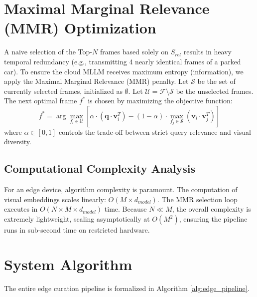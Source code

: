 \documentclass[11pt, a4paper, oneside]{report}
\begin{document}
\section{Maximal Marginal Relevance (MMR) Optimization}
A naive selection of the Top-$N$ frames based solely on $S_{rel}$ results in heavy temporal redundancy (e.g., transmitting 4 nearly identical frames of a parked car). To ensure the cloud MLLM receives maximum entropy (information), we apply the Maximal Marginal Relevance (MMR) penalty.
Let $\mathcal{S}$ be the set of currently selected frames, initialized as $\emptyset$. Let $\mathcal{U} = \mathcal{F} \setminus \mathcal{S}$ be the unselected frames. The next optimal frame $f^*$ is chosen by maximizing the objective function:
\begin{equation}
f^* = \arg\max_{f_i \in \mathcal{U}} \left[ \alpha \cdot (\mathbf{q} \cdot \mathbf{v}_i^T) - (1 - \alpha) \cdot \max_{f_j \in \mathcal{S}} (\mathbf{v}_i \cdot \mathbf{v}_j^T) \right]
\end{equation}
where $\alpha \in [0, 1]$ controls the trade-off between strict query relevance and visual diversity.

\subsection{Computational Complexity Analysis}
For an edge device, algorithm complexity is paramount. The computation of visual embeddings scales linearly: $O(M \times d_{model})$. The MMR selection loop executes in $O(N \times M \times d_{model})$ time. Because $N \ll M$, the overall complexity is extremely lightweight, scaling asymptotically at $O(M^2)$, ensuring the pipeline runs in sub-second time on restricted hardware.

\section{System Algorithm}
The entire edge curation pipeline is formalized in Algorithm \ref{alg:edge_pipeline}.
\end{document}
